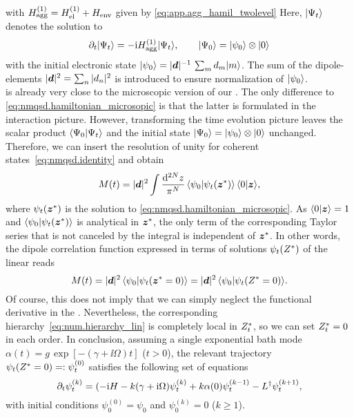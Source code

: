 with $H_\mathrm{agg}^{(1)} = H_\mathrm{el}^{(1)} + H_\mathrm{env}$ given by \autoref{eq:app.agg_hamil_twolevel}
Here, $| \Psi_t \rangle$ denotes the solution to
\begin{equation}
  \partial_t | \Psi_t \rangle = -\mathrm{i} H_\mathrm{agg}^{(1)} | \Psi_t \rangle, \qquad | \Psi_0 \rangle = | \psi_0 \rangle\otimes| 0 \rangle
  \label{eq:app.eqom}
\end{equation}
with the initial electronic state $| \psi_0 \rangle = \vert \boldsymbol{d} \vert^{-1} \, \sum_m d_m | m \rangle$.
The sum of the dipole-elements $\vert \boldsymbol{d} \vert^2 = \sum_n \vert d_n \vert^2$ is introduced to ensure normalization of $| \psi_0 \rangle$.\\



 is already very close to the microscopic version of our {\NMSSE}.
The only difference to \autoref{eq:nmqsd.hamiltonian_microsopic} is that the latter is formulated in the interaction picture.
However, transforming the time evolution picture leaves the scalar product $\langle \Psi_0 | \Psi_t \rangle$ and the initial state $| \Psi_0 \rangle = | \psi_0 \rangle \otimes | 0 \rangle$ unchanged.
Therefore, we can insert the resolution of unity for coherent states~\ref{eq:nmqsd.identity} and obtain
\begin{equation*}
  M(t) = \abs{\vec d}^2 \int \frac{\mathrm{d}^{2N}z}{\pi^N} \, \braket{\psi_0}{\psitz} \, \braket{0}{\zz},
\end{equation*}
where $\psitz$ is the solution to \autoref{eq:nmqsd.hamiltonian_microsopic}.
As $\langle 0 | \boldsymbol{z} \rangle = 1$ and $\langle \psi_0 | \psi_t({\boldsymbol{z}}^*) \rangle$ is analytical in ${\boldsymbol{z}}^*$, the only term of the corresponding Taylor series that is not canceled by the integral is independent of ${\boldsymbol{z}}^*$.
In other words, the dipole correlation function expressed in terms of solutions $\psitZ$ of the linear \NMSSE reads
\begin{equation}
  M(t) = \vert \boldsymbol{d} \vert^2 \, \langle \psi_0 | \psi_t({\boldsymbol{z}}^* = 0) \rangle = \vert \boldsymbol{d} \vert^2 \, \langle \psi_0 | \psi_t({Z}^* = 0) \rangle.
  \label{eq:app.dipole_correlation_nmsse}
\end{equation}
Of course, this does not imply that we can simply neglect the functional derivative in the {\NMSSE}.
Nevertheless, the corresponding hierarchy~\ref{eq:num.hierarchy_lin} is completely local in ${Z}^*_t$, so we can set ${Z}^*_t = 0$ in each order.
In conclusion, assuming a single exponential bath mode $\alpha(t) = g\,\exp[-(\gamma + \ii\Omega) t]$ ($t > 0$), the relevant trajectory $\psi_t(\ZZ = 0) =: \psit[0]$ satisfies the following set of equations
\begin{equation}
  \partial_t\psit[k] = (-\ii\Hsys -  k(\gamma + \ii\Omega)\psit[k] + k \alpha(0) \psit[k-1] - \adj{L} \psit[k+1],
  \label{eq:app.spectrum_hierarchy}
\end{equation}
with initial conditions $\psi_0^{(0)} = \psi_0$ and $\psi_0^{(k)} = 0$ ($k \ge 1$).

